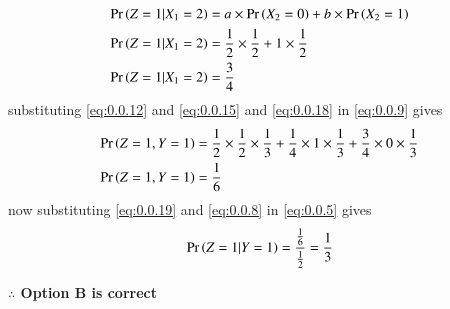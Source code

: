 \documentclass[journal,12pt,twocolumn]{IEEEtran}
\begin{document}
    \begin{align}
    \Pr\left(Z=1|X_1=2\right)&=a\times \Pr\left(X_2=0\right)+b \times \Pr\left(X_2=1\right)\\
        \Pr\left(Z=1|X_1=2\right)&=\frac{1}{2}\times \frac{1}{2}+1 \times \frac{1}{2}\\
        \Pr\left(Z=1|X_1=2\right)&=\frac{3}{4}\label{eq:0.0.18}
    \end{align}
substituting \eqref{eq:0.0.12} and \eqref{eq:0.0.15} and \eqref{eq:0.0.18} in \eqref{eq:0.0.9} gives 
\begin{align}
\begin{split}
    \Pr\left(Z=1,Y=1\right)&=\frac{1}{2}\times \frac{1}{2}\times \frac{1}{3}+\frac{1}{4} \times 1\times \frac{1}{3}+\frac{3}{4} \times 0 \times \frac{1}{3}\\
    \Pr\left(Z=1,Y=1\right)&=\frac{1}{6}\label{eq:0.0.19}
    \end{split}
    \end{align}
    \newpage
    now substituting \eqref{eq:0.0.19} and \eqref{eq:0.0.8} in \eqref{eq:0.0.5} gives
    \begin{align}
        \Pr\left(Z=1|Y=1\right)=\frac{\frac{1}{6}}{\frac{1}{2}}=\frac{1}{3}
    \end{align}
    \begin{center}
     \textbf{$\therefore$ Option B is correct}    
    \end{center}
\end{document}
